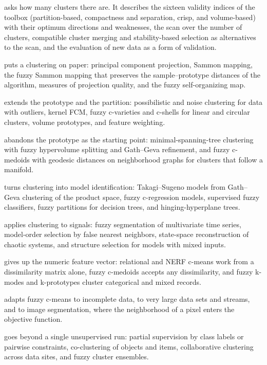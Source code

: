  asks how many clusters there are. It describes the sixteen validity indices of the toolbox (partition-based, compactness and separation, crisp, and volume-based) with their optimum directions and weaknesses, the scan over the number of clusters, compatible cluster merging and stability-based selection as alternatives to the scan, and the evaluation of new data as a form of validation.

 puts a clustering on paper: principal component projection, Sammon mapping, the fuzzy Sammon mapping that preserves the sample--prototype distances of the algorithm, measures of projection quality, and the fuzzy self-organizing map.

 extends the prototype and the partition: possibilistic and noise clustering for data with outliers, kernel FCM, fuzzy c-varieties and c-shells for linear and circular clusters, volume prototypes, and feature weighting.

 abandons the prototype as the starting point: minimal-spanning-tree clustering with fuzzy hypervolume splitting and Gath--Geva refinement, and fuzzy c-medoids with geodesic distances on neighborhood graphs for clusters that follow a manifold.

 turns clustering into model identification: Takagi--Sugeno models from Gath--Geva clustering of the product space, fuzzy c-regression models, supervised fuzzy classifiers, fuzzy partitions for decision trees, and hinging-hyperplane trees.

 applies clustering to signals: fuzzy segmentation of multivariate time series, model-order selection by false nearest neighbors, state-space reconstruction of chaotic systems, and structure selection for models with mixed inputs.

 gives up the numeric feature vector: relational and NERF c-means work from a dissimilarity matrix alone, fuzzy c-medoids accepts any dissimilarity, and fuzzy k-modes and k-prototypes cluster categorical and mixed records.

 adapts fuzzy c-means to incomplete data, to very large data sets and streams, and to image segmentation, where the neighborhood of a pixel enters the objective function.

 goes beyond a single unsupervised run: partial supervision by class labels or pairwise constraints, co-clustering of objects and items, collaborative clustering across data sites, and fuzzy cluster ensembles.


